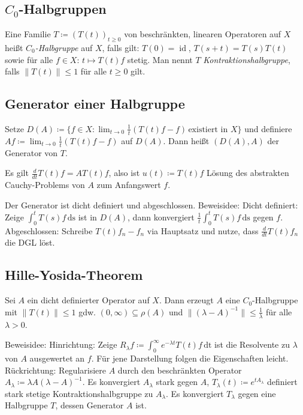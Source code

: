 \documentclass[11pt,a4paper]{scrartcl}
\theoremstyle{plain}
\theoremstyle{definition}
\theoremstyle{remark}
\DeclareMathOperator{\id}{id}
\begin{document}
\subsection{$C_0$-Halbgruppen}

Eine Familie $T\coloneqq (T(t))_{t\geq 0}$ von beschränkten, linearen Operatoren auf $X$ heißt \emph{$C_0$-Halbgruppe} auf $X$, falls gilt: $T(0)=\id$, $T(s+t)=T(s)T(t)$ sowie für alle $f\in X$: $t\mapsto T(t)f$ stetig. Man nennt $T$ \emph{Kontraktionshalbgruppe}, falls $\|T(t)\| \leq 1$ für alle $t\geq 0$ gilt.

\subsection{Generator einer Halbgruppe}

Setze $D(A)\coloneqq \{ f\in X: \lim_{t\to 0} \frac{1}{t}(T(t)f-f) \, \text{existiert in } X \}$ und definiere $Af \coloneqq \lim_{t\to 0} \frac{1}{t}(T(t)f-f)$ auf $D(A)$. Dann heißt $(D(A),A)$ der Generator von $T$.

Es gilt $\frac{d}{dt} T(t)f = AT(t)f$, also ist $u(t)\coloneqq T(t)f$ Lösung des abstrakten Cauchy-Problems von $A$ zum Anfangswert $f$.

Der Generator ist dicht definiert und abgeschlossen. Beweisidee: Dicht definiert: Zeige $\int_0^t T(s)f \, \mathrm{ds}$ ist in $D(A)$, dann konvergiert $\frac{1}{t} \int_0^t T(s)f \, \mathrm{ds}$ gegen $f$. Abgeschlossen: Schreibe $T(t)f_n-f_n$ via Hauptsatz und nutze, dass $\frac{d}{dt} T(t)f_n$ die DGL löst.

\subsection{Hille-Yosida-Theorem}

Sei $A$ ein dicht definierter Operator auf $X$. Dann erzeugt $A$ eine $C_0$-Halbgruppe mit $\|T(t)\| \leq 1$ gdw. $(0,\infty) \subseteq \rho(A)$ und $\|(\lambda-A)^{-1}\| \leq \frac{1}{\lambda}$ für alle $\lambda > 0$. 

Beweisidee: Hinrichtung: Zeige $R_\lambda f\coloneqq \int_{0}^{\infty} e^{-\lambda t}T(t)f \, \mathrm{dt}$ ist die Resolvente zu $\lambda$ von $A$ ausgewertet an $f$. Für jene Darstellung folgen die Eigenschaften leicht. Rückrichtung: Regularisiere $A$ durch den beschränkten Operator $A_\lambda \coloneqq \lambda A (\lambda-A)^{-1}$. Es konvergiert $A_\lambda$ stark gegen $A$, $T_\lambda(t) \coloneqq e^{tA_\lambda}$ definiert stark stetige Kontraktionshalbgruppe zu $A_\lambda$. Es konvergiert $T_\lambda$ gegen eine Halbgruppe $T$, dessen Generator $A$ ist.
\end{document}
